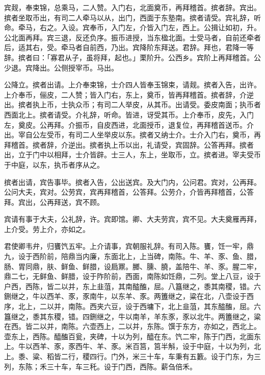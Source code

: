 \documentclass[]{article}
\begin{document}
宾觌，奉束锦，总乘马，二人赞。入门右，北面奠币，再拜稽首。摈者辞。宾出。摈者坐取币出，有司二人牵马以从，出门，西面于东塾南。摈者请受。宾礼辞，听命。牵马，右之。入设。宾奉币，入门左，介皆入门左，西上。公揖让如初，升。公北面再拜。宾三退，反还负序。振币进授，当东楹北面。士受马者，自前还牵者后，适其右，受。牵马者自前西，乃出。宾降阶东拜送。君辞。拜也，君降一等辞。摈者曰：「寡君从子，虽将拜，起也。」栗阶升。公西乡。宾阶上再拜稽首。公少退。宾降出。公侧授宰币。马出。

公降立。摈者出请。上介奉束锦，士介四人皆奉玉锦束，请觌。摈者入告，出许。上介奉币，俪皮，二人赞；皆入门右，东上，奠币，皆再拜稽首。摈者辞，介逆出。摈者执上币，士执众币；有司二人举皮，从其币。出请受。委皮南面；执币者西面北上。摈者请受。介礼辞，听命。皆进，讶受其币。上介奉币，皮先，入门左，奠皮。公再拜。介振币，自皮西进，北面授币，退复位，再拜稽首送币。介出。宰自公左受币，有司二人坐举皮以东。摈者又纳士介。士介入门右，奠币，再拜稽首。摈者辞，介逆出。摈者执上币以出，礼请受，宾固辞。公答再拜。摈者出，立于门中以相拜，士介皆辟。士三人，东上，坐取币，立。摈者进。宰夫受币于中庭，以东，执币者序从之。

摈者出请，宾告事毕。摈者入告，公出送宾。及大门内，公问君。宾对，公再拜。公问大夫，宾对。公劳宾，宾再拜稽首，公答拜。公劳介，介皆再拜稽首，公答拜。宾出，公再拜送，宾不顾。

宾请有事于大夫，公礼辞，许。宾即馆。卿、大夫劳宾，宾不见。大夫奠雁再拜，上介受。劳上介，亦如之。

君使卿韦弁，归饔饩五牢。上介请事，宾朝服礼辞。有司入陈。饔，饪一牢，鼎九，设于西阶前，陪鼎当内廉，东面北上，上当碑，南陈。牛、羊、豕、鱼、腊，肠、胃同鼎，肤、鲜鱼、鲜腊，设扃鼏。膷、臐、膮，盖陪牛、羊、豕。腥二牢，鼎二七，无鲜鱼、鲜腊，设于阼阶前，西面，南陈如饪鼎，二列。堂上八豆，设于户西，西陈，皆二以并，东上韭菹，其南醓醢，屈。八簋继之，黍其南稷，错。六鉶继之，牛以西羊、豕，豕南牛，以东羊、豕。两簠继之，粱在北，八壶设于西序，北上，二以并，南陈。西夹六豆，设于西墉下，北上韭菹，其东醓醢，屈。六簋继之，黍其东稷，错。四鉶继之，牛以南羊，羊东豕，豕以北牛。两簠继之，粱在西。皆二以并，南陈。六壶西上，二以并，东陈。馔于东方，亦如之，西北上。壶东上，西陈。醯醢百瓮，夹碑，十以为列，醯在东。饩二牢，陈于门西，北面东上。牛以西羊、豕，豕西牛、羊、豕。米百筥，筥半斛，设于中庭，十以为列，北上。黍、粱、稻皆二行，稷四行。门外，米三十车，车秉有五籔。设于门东，为三列，东陈；禾三十车，车三秅。设于门西，西陈。薪刍倍禾。
\end{document}
